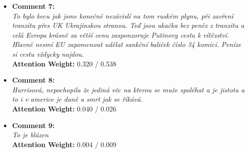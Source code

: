 \documentclass[twoside]{ctuthesis}
\theoremstyle{plain}
\theoremstyle{definition}
\theoremstyle{note}
\begin{document}
\begin{tcolorbox}[colback=white, colframe=black, title=User C - Trolliness Score: 0.478 (Multilingual Model) / 0.434 (Russian Model)]
\begin{itemize}
    \item \textbf{Comment 7:} \\
    \textit{To bylo kecu jak jsme konečně nezávislí na tom ruském plynu, při zavření tranzitu přes UK Ukrajinskou stranou. Teď jsou ukačka bez peněz z tranzitu a celá Evropa krásně za větší cenu zasponzoruje Putinovy cestu k vítězství. Hlavně nesmí EU zapomenout udělat sankční baliček číslo 34 komici. Peníze si cestu vždycky najdou.} \\
    \textbf{Attention Weight:} 0.320 / 0.538

    \vspace{0.2cm}

    \item \textbf{Comment 8:} \\
    \textit{Harrisová, nepochopila že jediná věc na kterou se muže spoléhat a je jistota a to i v americe je daně a smrt jak se říkává.} \\
    \textbf{Attention Weight:} 0.040 / 0.026

    \vspace{0.2cm}

    \item \textbf{Comment 9:} \\
    \textit{To je blázen} \\
    \textbf{Attention Weight:} 0.004 / 0.009
\end{itemize}
\end{tcolorbox}
\end{document}
